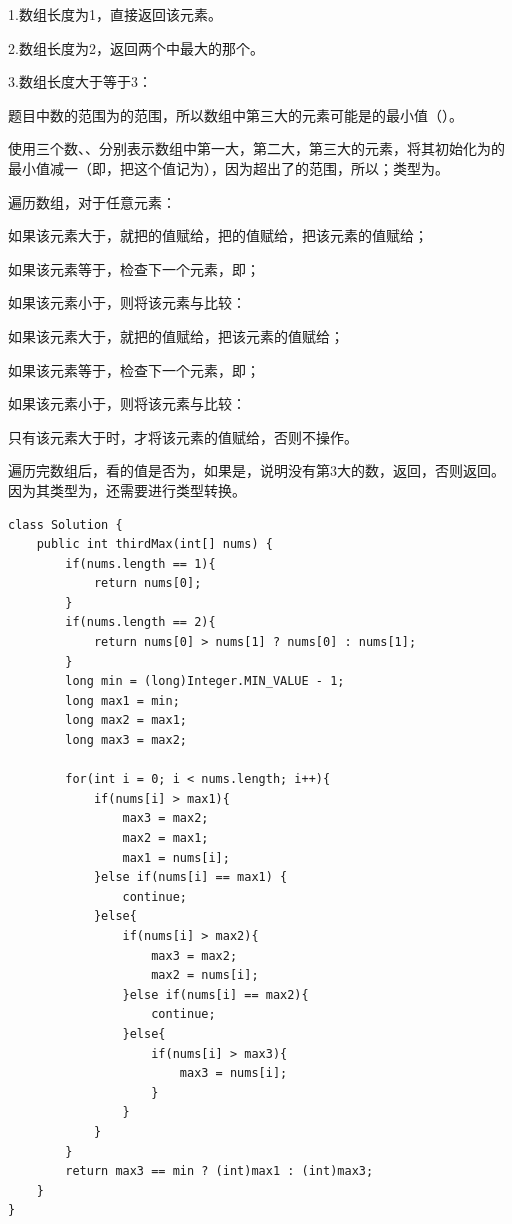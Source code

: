 \documentclass[30pt]{article}
\begin{document}
\begin{tips}
1.数组长度为1，直接返回该元素。

2.数组长度为2，返回两个中最大的那个。

3.数组长度大于等于3：

题目中数的范围为的范围，所以数组中第三大的元素可能是的最小值（）。

使用三个数、、分别表示数组中第一大，第二大，第三大的元素，将其初始化为的最小值减一（即，把这个值记为），因为超出了的范围，所以；类型为。

遍历数组，对于任意元素：

如果该元素大于，就把的值赋给，把的值赋给，把该元素的值赋给；

如果该元素等于，检查下一个元素，即；

如果该元素小于，则将该元素与比较：

如果该元素大于，就把的值赋给，把该元素的值赋给；

如果该元素等于，检查下一个元素，即；

如果该元素小于，则将该元素与比较：

只有该元素大于时，才将该元素的值赋给，否则不操作。

遍历完数组后，看的值是否为，如果是，说明没有第3大的数，返回，否则返回。因为其类型为，还需要进行类型转换。
\end{tips}

\begin{lstlisting}[title=第三大的数]
class Solution {
    public int thirdMax(int[] nums) {
        if(nums.length == 1){
            return nums[0];
        }
        if(nums.length == 2){
            return nums[0] > nums[1] ? nums[0] : nums[1];
        }
        long min = (long)Integer.MIN_VALUE - 1;
        long max1 = min;
        long max2 = max1;
        long max3 = max2;

        for(int i = 0; i < nums.length; i++){
            if(nums[i] > max1){
                max3 = max2;
                max2 = max1;
                max1 = nums[i];
            }else if(nums[i] == max1) {
                continue;
            }else{
                if(nums[i] > max2){
                    max3 = max2;
                    max2 = nums[i];
                }else if(nums[i] == max2){
                    continue;
                }else{
                    if(nums[i] > max3){
                        max3 = nums[i];
                    }
                }
            }
        }
        return max3 == min ? (int)max1 : (int)max3;
    }
}
\end{lstlisting}
\newpage
\end{document}
